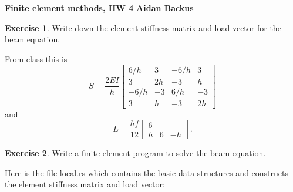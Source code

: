 \documentclass[10pt]{article}
\theoremstyle{definition}
\newtheorem{exer}{Exercise}
\begin{document}
\noindent
\large\textbf{Finite element methods, HW 4} \hfill \textbf{Aidan Backus} \\

\begin{exer}
Write down the element stiffness matrix and load vector for the beam equation.
\end{exer}

From class this is 
$$S = \frac{2EI}{h} \begin{bmatrix} 6/h & 3 & -6/h & 3 \\ 3 & 2h & -3 & h \\ -6/h & -3 & 6/h & -3 \\ 3 & h & -3 & 2h\end{bmatrix}$$
and 
$$L = \frac{hf}{12} \begin{bmatrix} 6 \\ h & 6 & -h\end{bmatrix}.$$

\begin{exer}
Write a finite element program to solve the beam equation.
\end{exer}

Here is the file local.rs which contains the basic data structures and constructs the element stiffness matrix and load vector:
\end{document}
